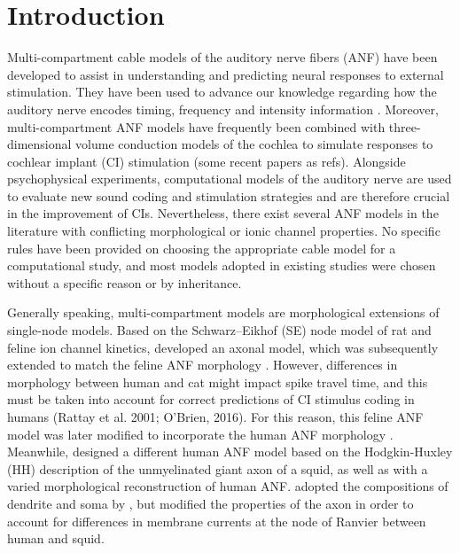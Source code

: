 \documentclass[utf8]{frontiersSCNS} %
\begin{document}
\section{Introduction}
\label{sec:introduction}

Multi-compartment cable models of the auditory nerve fibers (ANF) have been developed to assist in understanding and predicting neural responses to external stimulation. They have been used to advance our knowledge regarding how the auditory nerve encodes timing, frequency and intensity information \citep{Imennov2009}. Moreover, multi-compartment ANF models have frequently been combined with three-dimensional volume conduction models of the cochlea to simulate responses to cochlear implant (CI) stimulation (some recent papers as refs). Alongside psychophysical experiments, computational models of the auditory nerve are used to evaluate new sound coding and stimulation strategies and are therefore crucial in the improvement of CIs. Nevertheless, there exist several ANF models in the literature with conflicting  morphological or ionic channel properties. No specific rules have been provided on choosing the appropriate cable model for a computational study, and most models adopted in existing studies were chosen without a specific reason or by inheritance.

Generally speaking, multi-compartment models are morphological extensions of single-node models. Based on the Schwarz–Eikhof (SE) node model of rat and feline ion channel kinetics, \cite{Frijns1994} developed an axonal model, which was subsequently extended to match the feline ANF morphology \citep{Frijns1995}. 
However, differences in morphology between human and cat might impact spike travel time, and this must be taken into account for correct predictions of CI stimulus coding in humans (Rattay et al. 2001; O'Brien, 2016). For this reason, this feline ANF model was later modified to incorporate the human ANF morphology \citep{Briaire2005}. Meanwhile, \cite{Rattay2001} designed a different human ANF model based on the Hodgkin-Huxley (HH) description of the unmyelinated giant axon of a squid, as well as with a varied morphological reconstruction of human ANF.
 \cite{Smit2008} adopted the compositions of dendrite and soma by \cite{Rattay2001}, but modified the properties of the axon in order to account for differences in membrane currents at the node of Ranvier between human \citep{Schwarz1995} and squid. 
\end{document}
